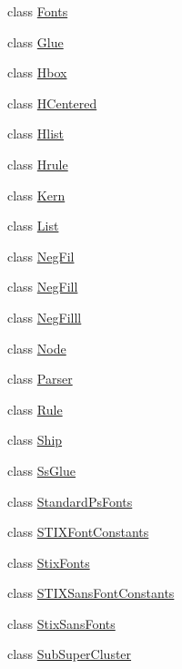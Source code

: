 \begin{DoxyCompactItemize}
\item 
class \hyperlink{classmatplotlib_1_1__mathtext_1_1Fonts}{Fonts}
\item 
class \hyperlink{classmatplotlib_1_1__mathtext_1_1Glue}{Glue}
\item 
class \hyperlink{classmatplotlib_1_1__mathtext_1_1Hbox}{Hbox}
\item 
class \hyperlink{classmatplotlib_1_1__mathtext_1_1HCentered}{H\+Centered}
\item 
class \hyperlink{classmatplotlib_1_1__mathtext_1_1Hlist}{Hlist}
\item 
class \hyperlink{classmatplotlib_1_1__mathtext_1_1Hrule}{Hrule}
\item 
class \hyperlink{classmatplotlib_1_1__mathtext_1_1Kern}{Kern}
\item 
class \hyperlink{classmatplotlib_1_1__mathtext_1_1List}{List}
\item 
class \hyperlink{classmatplotlib_1_1__mathtext_1_1NegFil}{Neg\+Fil}
\item 
class \hyperlink{classmatplotlib_1_1__mathtext_1_1NegFill}{Neg\+Fill}
\item 
class \hyperlink{classmatplotlib_1_1__mathtext_1_1NegFilll}{Neg\+Filll}
\item 
class \hyperlink{classmatplotlib_1_1__mathtext_1_1Node}{Node}
\item 
class \hyperlink{classmatplotlib_1_1__mathtext_1_1Parser}{Parser}
\item 
class \hyperlink{classmatplotlib_1_1__mathtext_1_1Rule}{Rule}
\item 
class \hyperlink{classmatplotlib_1_1__mathtext_1_1Ship}{Ship}
\item 
class \hyperlink{classmatplotlib_1_1__mathtext_1_1SsGlue}{Ss\+Glue}
\item 
class \hyperlink{classmatplotlib_1_1__mathtext_1_1StandardPsFonts}{Standard\+Ps\+Fonts}
\item 
class \hyperlink{classmatplotlib_1_1__mathtext_1_1STIXFontConstants}{S\+T\+I\+X\+Font\+Constants}
\item 
class \hyperlink{classmatplotlib_1_1__mathtext_1_1StixFonts}{Stix\+Fonts}
\item 
class \hyperlink{classmatplotlib_1_1__mathtext_1_1STIXSansFontConstants}{S\+T\+I\+X\+Sans\+Font\+Constants}
\item 
class \hyperlink{classmatplotlib_1_1__mathtext_1_1StixSansFonts}{Stix\+Sans\+Fonts}
\item 
class \hyperlink{classmatplotlib_1_1__mathtext_1_1SubSuperCluster}{Sub\+Super\+Cluster}

\end{DoxyCompactItemize}

